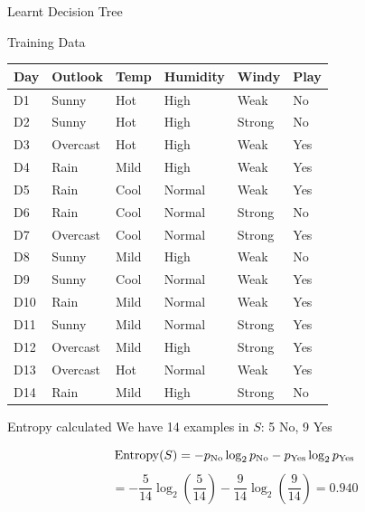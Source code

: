 \documentclass[usenames,dvipsnames]{beamer}
\begin{document}
\begin{frame}{Learnt Decision Tree}

\end{frame}

	\begin{frame}{Training Data}
\begin{tabular}{lllll||l} \toprule
	\textbf{Day} & \textbf{Outlook}  & \textbf{Temp} & \textbf{Humidity} & \textbf{Windy}  & \textbf{Play} \\ \midrule
	D1  & Sunny    & Hot  & High     & Weak   & No   \\
	D2  & Sunny    & Hot  & High     & Strong & No   \\
	D3  & Overcast & Hot  & High     & Weak   & Yes  \\
	D4  & Rain     & Mild & High     & Weak   & Yes  \\
	D5  & Rain     & Cool & Normal   & Weak   & Yes  \\
	D6  & Rain     & Cool & Normal   & Strong & No   \\
	D7  & Overcast & Cool & Normal   & Strong & Yes  \\
	D8  & Sunny    & Mild & High     & Weak   & No   \\
	D9  & Sunny    & Cool & Normal   & Weak   & Yes  \\
	D10 & Rain     & Mild & Normal   & Weak   & Yes  \\
	D11 & Sunny    & Mild & Normal   & Strong & Yes  \\
	D12 & Overcast & Mild & High     & Strong & Yes  \\
	D13 & Overcast & Hot  & Normal   & Weak   & Yes  \\
	D14 & Rain     & Mild & High     & Strong & No  \\ \bottomrule
\end{tabular}
\end{frame}


\begin{frame}{Entropy calculated}
We have 14 examples in $S$: 5 No, 9 Yes

$$\operatorname{Entropy}(S) = -p_{\text{No}} \log_2 p_{\text{No}} - p_{\text{Yes}} \log_2 p_{\text{Yes}}$$
$$
= -\frac{5}{14} \log_2\left(\frac{5}{14}\right) - \frac{9}{14} \log_2\left(\frac{9}{14}\right) = 0.940
$$
\end{frame}
\end{document}
